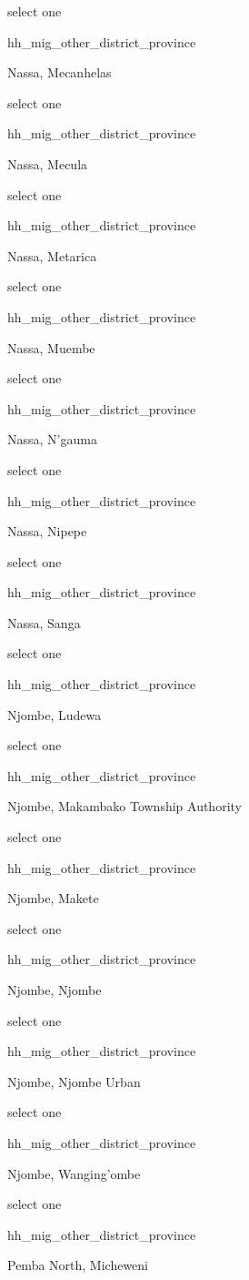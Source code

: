 \documentclass[]{article}
\begin{document}
select one

hh\_mig\_other\_district\_province

Nassa, Mecanhelas

select one

hh\_mig\_other\_district\_province

Nassa, Mecula

select one

hh\_mig\_other\_district\_province

Nassa, Metarica

select one

hh\_mig\_other\_district\_province

Nassa, Muembe

select one

hh\_mig\_other\_district\_province

Nassa, N'gauma

select one

hh\_mig\_other\_district\_province

Nassa, Nipepe

select one

hh\_mig\_other\_district\_province

Nassa, Sanga

select one

hh\_mig\_other\_district\_province

Njombe, Ludewa

select one

hh\_mig\_other\_district\_province

Njombe, Makambako Township Authority

select one

hh\_mig\_other\_district\_province

Njombe, Makete

select one

hh\_mig\_other\_district\_province

Njombe, Njombe

select one

hh\_mig\_other\_district\_province

Njombe, Njombe Urban

select one

hh\_mig\_other\_district\_province

Njombe, Wanging'ombe

select one

hh\_mig\_other\_district\_province

Pemba North, Micheweni
\end{document}
